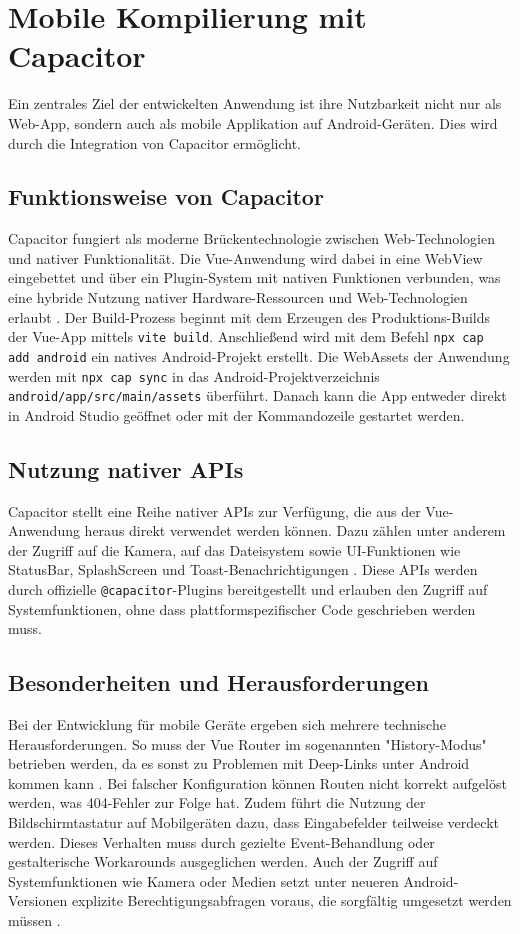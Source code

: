 \section{Mobile Kompilierung mit Capacitor}
\label{chap:capacitor}

Ein zentrales Ziel der entwickelten Anwendung ist ihre Nutzbarkeit nicht nur als Web-App, sondern auch als mobile Applikation auf Android-Geräten. Dies wird durch die Integration von Capacitor ermöglicht.

\subsection{Funktionsweise von Capacitor}
Capacitor fungiert als moderne Brückentechnologie zwischen Web-Technologien und nativer Funktionalität. Die Vue-Anwendung wird dabei in eine WebView eingebettet und über ein Plugin-System mit nativen Funktionen verbunden, was eine hybride Nutzung nativer Hardware-Ressourcen und Web-Technologien erlaubt \cite{Singh2021, Giordano2024}. Der Build-Prozess beginnt mit dem Erzeugen des Produktions-Builds der Vue-App mittels \texttt{vite build}. Anschließend wird mit dem Befehl \texttt{npx cap add android} ein natives Android-Projekt erstellt. Die WebAssets der Anwendung werden mit \texttt{npx cap sync} in das Android-Projektverzeichnis \texttt{android/app/src/main/assets} überführt. Danach kann die App entweder direkt in Android Studio geöffnet oder mit der Kommandozeile gestartet werden.

\subsection{Nutzung nativer APIs}
Capacitor stellt eine Reihe nativer APIs zur Verfügung, die aus der Vue-Anwendung heraus direkt verwendet werden können. Dazu zählen unter anderem der Zugriff auf die Kamera, auf das Dateisystem sowie UI-Funktionen wie StatusBar, SplashScreen und Toast-Benachrichtigungen \cite{Singh2021}. Diese APIs werden durch offizielle \texttt{@capacitor}-Plugins bereitgestellt und erlauben den Zugriff auf Systemfunktionen, ohne dass plattformspezifischer Code geschrieben werden muss.

\subsection{Besonderheiten und Herausforderungen}
Bei der Entwicklung für mobile Geräte ergeben sich mehrere technische Herausforderungen. So muss der Vue Router im sogenannten "History-Modus" betrieben werden, da es sonst zu Problemen mit Deep-Links unter Android kommen kann \cite{CapacitorDocs}. Bei falscher Konfiguration können Routen nicht korrekt aufgelöst werden, was 404-Fehler zur Folge hat. Zudem führt die Nutzung der Bildschirmtastatur auf Mobilgeräten dazu, dass Eingabefelder teilweise verdeckt werden. Dieses Verhalten muss durch gezielte Event-Behandlung oder gestalterische Workarounds ausgeglichen werden. Auch der Zugriff auf Systemfunktionen wie Kamera oder Medien setzt unter neueren Android-Versionen explizite Berechtigungsabfragen voraus, die sorgfältig umgesetzt werden müssen \cite{Singh2021}.

